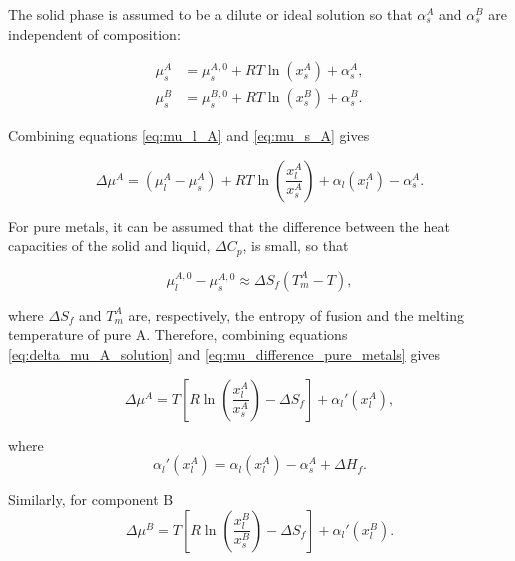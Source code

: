 The solid phase is assumed to be a dilute or ideal solution so that \(\alpha_s^A\) and \(\alpha_s^B\) are independent of composition:

\begin{align}
\mu_s^A &= \mu_s^{A,0} + RT \ln(x_s^A) + \alpha_s^A, \label{eq:mu_s_A} \\
\mu_s^B &= \mu_s^{B,0} + RT \ln(x_s^B) + \alpha_s^B. \label{eq:mu_s_B}
\end{align}

Combining equations \eqref{eq:mu_l_A} and \eqref{eq:mu_s_A} gives

\begin{equation}
\Delta \mu^A = (\mu_l^{A} - \mu_s^{A}) + RT \ln\left(\frac{x_l^A}{x_s^A}\right) + \alpha_l(x_l^A) - \alpha_s^A. \label{eq:delta_mu_A_solution}
\end{equation}

For pure metals, it can be assumed that the difference between the heat capacities of the solid and liquid, \(\Delta C_p\), is small, so that

\begin{equation}
\mu_l^{A,0} - \mu_s^{A,0} \approx \Delta S_f (T_m^A - T), \label{eq:mu_difference_pure_metals}
\end{equation}

where \(\Delta S_f\) and \(T_m^A\) are, respectively, the entropy of fusion and the melting temperature of pure A. Therefore, combining equations \eqref{eq:delta_mu_A_solution} and \eqref{eq:mu_difference_pure_metals} gives

\begin{equation}
\Delta \mu^A = T \left[ R \ln\left(\frac{x_l^A}{x_s^A}\right) - \Delta S_f \right] + \alpha_l'(x_l^A), \label{eq:combined_delta_mu_A}
\end{equation}

where
\begin{equation}
\alpha_l'(x_l^A) = \alpha_l(x_l^A) - \alpha_s^A + \Delta H_f. \label{eq:alpha_prime_A}
\end{equation}

Similarly, for component B
\begin{equation}
\Delta \mu^B = T \left[ R \ln\left(\frac{x_l^B}{x_s^B}\right) - \Delta S_f \right] + \alpha_l'(x_l^B). \label{eq:delta_mu_B_solution}
\end{equation}

